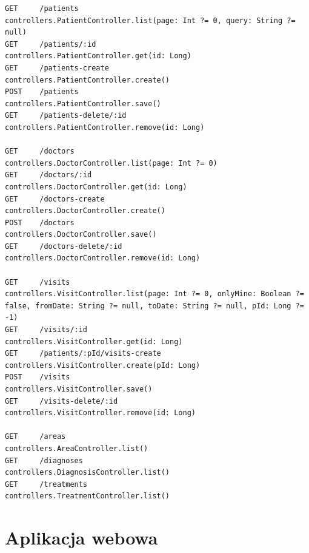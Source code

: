 \documentclass[11pt]{aghdpl}
\begin{document}
\begin{lstlisting}[caption={Fragment pliku zawierającego mapowanie wzorców URL do wywoływanych metod kontrolerów.}, label={lst:routes}]
GET     /patients                                               controllers.PatientController.list(page: Int ?= 0, query: String ?= null)
GET     /patients/:id                                           controllers.PatientController.get(id: Long)
GET     /patients-create                                        controllers.PatientController.create()
POST    /patients                                                 controllers.PatientController.save()
GET     /patients-delete/:id                                     controllers.PatientController.remove(id: Long)

GET     /doctors                                                 controllers.DoctorController.list(page: Int ?= 0)
GET     /doctors/:id                                             controllers.DoctorController.get(id: Long)
GET     /doctors-create                                          controllers.DoctorController.create()
POST    /doctors                                                   controllers.DoctorController.save()
GET     /doctors-delete/:id                                      controllers.DoctorController.remove(id: Long)

GET     /visits                                                  controllers.VisitController.list(page: Int ?= 0, onlyMine: Boolean ?= false, fromDate: String ?= null, toDate: String ?= null, pId: Long ?= -1)
GET     /visits/:id                                              controllers.VisitController.get(id: Long)
GET     /patients/:pId/visits-create                             controllers.VisitController.create(pId: Long)
POST    /visits                                                  controllers.VisitController.save()
GET     /visits-delete/:id                                       controllers.VisitController.remove(id: Long)

GET     /areas                                                   controllers.AreaController.list()
GET     /diagnoses                                               controllers.DiagnosisController.list()
GET     /treatments                                              controllers.TreatmentController.list()
\end{lstlisting}

\section{Aplikacja webowa}
\end{document}
